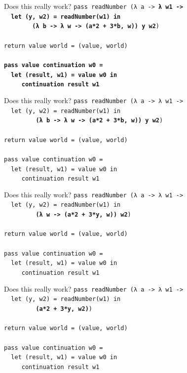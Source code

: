 \documentclass{beamer}
\begin{document}
\begin{frame}{Does this really work?}
  \texttt{pass readNumber (λ a -> \textbf{λ w1 -> \\
      \ \ let (y, w2) = readNumber(w1) in\\
      \ \ \ \ \ \ \ \ (λ b -> λ w -> (a*2 + 3*b, w)) y w2})\\
    \ \\
    return value world = (value, world) \\
    \ \\
    \textbf{pass value continuation w0 = \\
      \ \ let (result, w1) = value w0 in \\
      \ \ \ \ \ continuation result w1}
  }
\end{frame}

\begin{frame}{Does this really work?}
  \texttt{pass readNumber (λ a -> λ w1 -> \\
    \ \ let (y, w2) = readNumber(w1) in\\
    \ \ \ \ \ \ \ \ \ \textbf{(λ b -> λ w -> (a*2 + 3*b, w)) y w2})\\
    \ \\
    return value world = (value, world) \\
    \ \\
    pass value continuation w0 = \\
    \ \ let (result, w1) = value w0 in \\
    \ \ \ \ \ continuation result w1
  }
\end{frame}

\begin{frame}{Does this really work?}
  \texttt{pass readNumber (λ a -> λ w1 -> \\
    \ \ let (y, w2) = readNumber(w1) in\\
    \ \ \ \ \ \ \ \ \ \textbf{(λ w -> (a*2 + 3*y, w)) w2})\\
    \ \\
    return value world = (value, world) \\
    \ \\
    pass value continuation w0 = \\
    \ \ let (result, w1) = value w0 in \\
    \ \ \ \ \ continuation result w1
  }
\end{frame}

\begin{frame}{Does this really work?}
  \texttt{pass readNumber (λ a -> λ w1 -> \\
    \ \ let (y, w2) = readNumber(w1) in\\
    \ \ \ \ \ \ \ \ \ \textbf{(a*2 + 3*y, w2)})\\
    \ \\
    return value world = (value, world) \\
    \ \\
    pass value continuation w0 = \\
    \ \ let (result, w1) = value w0 in \\
    \ \ \ \ \ continuation result w1
  }
\end{frame}
\end{document}
